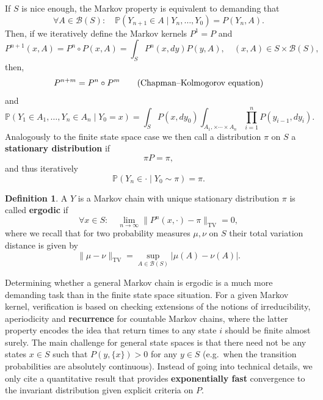 \documentclass[
]{book}
\theoremstyle{definition}
\newtheorem{definition}{Definition}[chapter]
\theoremstyle{definition}
\theoremstyle{definition}
\theoremstyle{definition}
\theoremstyle{remark}
\begin{document}
If \(S\) is nice enough, the Markov property is equivalent to demanding that 
\[\forall A \in \mathcal{B}(S): \quad \mathbb{P}(Y_{n+1} \in A \mid Y_n, \ldots, Y_0) = P(Y_n, A). \]
Then, if we iteratively define the Markov kernels \(P^1 = P\) and
\[P^{n+1}(x,A) = P^n \circ P(x,A) = \int_{S} P^{n}(x, dy) P(y, A), \quad (x,A) \in S \times \mathcal{B}(S),\]
then,
\begin{equation} 
P^{n+m} = P^n \circ P^m \tag{\text{Chapman--Kolmogorov equation}}
\end{equation}
and 
\begin{equation} 
\mathbb{P}(Y_1 \in A_1, \ldots, Y_n \in A_n \mid Y_0 = x) = \int_S P(x, dy_0)  \int_{A_1, \times \cdots \times A_n} \prod_{i=1}^n P(y_{i-1}, dy_i).
\end{equation}
Analogously to the finite state space case we then call a distribution \(\pi\) on \(S\) a  \textbf{stationary distribution} if 
\[\pi P = \pi,\]
and thus iteratively 
\[\mathbb{P}(Y_n \in \cdot \mid Y_0 \sim \pi) = \pi.\]
\begin{definition} 
A \(Y\) is a Markov chain with unique stationary distribution \(\pi\) is called \textbf{ergodic} if 
\[\forall x \in S: \quad \lim_{n \to \infty} \lVert P^n(x,\cdot) - \pi \rVert_{\mathrm{TV}} = 0,\]
where we recall that for two probability measures \(\mu,\nu\) on \(S\) their total variation distance is given by 
\[\lVert \mu - \nu \rVert_{\mathrm{TV}} = \sup_{A \in \mathcal{B}(S)} \lvert \mu(A) - \nu(A) \rvert.\]
\end{definition}
Determining whether a general Markov chain is ergodic is a much more demanding task than in the finite state space situation. For a given Markov kernel, verification is based on checking extensions of the notions of irreducibility, aperiodicity and \textbf{recurrence} for countable Markov chains, where the latter property encodes the idea that return times to any state \(i\) should be finite almost surely. The main challenge for general state spaces is that there need not be any states \(x \in S\) such that \(P(y,\{x\}) > 0\) for any \(y \in S\) (e.g.\ when the transition probabilities are absolutely continuous). Instead of going into technical details, we only cite a quantitative result that provides \textbf{exponentially fast} convergence to the invariant distribution given explicit criteria on \(P\).
\end{document}
